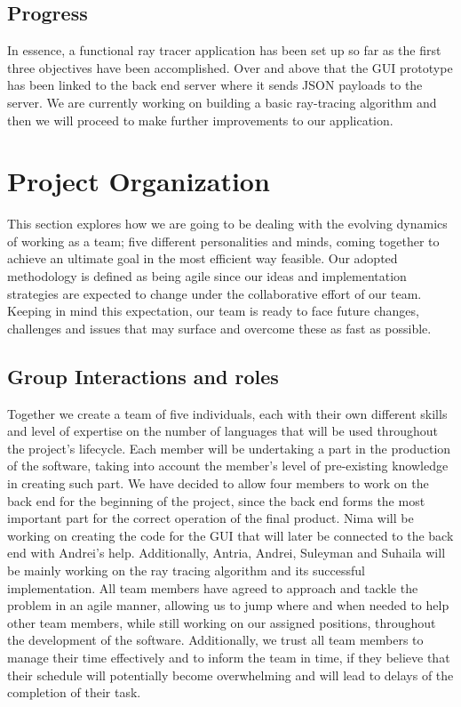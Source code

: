 \documentclass[11pt,a4paper]{article}
\begin{document}
\subsection{Progress}

In essence, a functional ray tracer application has been set up so far as the first three objectives have been accomplished. Over and above that the GUI prototype has been linked to the back end server where it sends JSON payloads to the server. We are currently working on building a basic ray-tracing algorithm and then we will proceed to make further improvements to our application. 

\section{Project Organization}

This section explores how we are going to be dealing with the evolving dynamics of working as a team; five different personalities and minds, coming together to achieve an ultimate goal in the most efficient way feasible. Our adopted methodology is defined as being agile since our ideas and implementation strategies are expected to change under the collaborative effort of our team. Keeping in mind this expectation, our team is ready to face future changes, challenges and issues that may surface and overcome these as fast as possible. 

\subsection{Group Interactions and roles}

Together we create a team of five individuals, each with their own different skills and level of expertise on the number of languages that will be used throughout the project’s lifecycle. Each member will be undertaking a part in the production of the software, taking into account the member’s level of pre-existing knowledge in creating such part. We have decided to allow four members to work on the back end for the beginning of the project, since the back end forms the most important part for the correct operation of the final product. Nima will be working on creating the code for the GUI that will later be connected to the back end with Andrei’s help. Additionally, Antria, Andrei, Suleyman and Suhaila will be mainly working on the ray tracing algorithm and its successful implementation. All team members have agreed to approach and tackle the problem in an agile manner, allowing us to jump where and when needed to help other team members, while still working on our assigned positions, throughout the development of the software. Additionally, we trust all team members to manage their time effectively and to inform the team in time, if they believe that their schedule will potentially become overwhelming and will lead to delays of the completion of their task.
\end{document}
